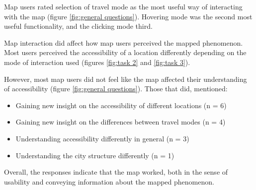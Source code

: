 Map users rated selection of travel mode as the most useful way of
interacting with the map (figure \ref{fig:general questions}).
Hovering mode was the second most useful functionality,
and the clicking mode third.

Map interaction did affect how map users perceived the mapped phenomenon.
Most users perceived the accessibility of a location differently depending
on the mode of interaction used (figures \ref{fig:task 2} and \ref{fig:task 3}).

However, most map users did not feel like the map affected
their understanding of accessibility (figure \ref{fig:general questions}).
Those that did, mentioned:

\begin{itemize}
	\item Gaining new insight on the accessibility of different locations (n = 6)
	\item Gaining new insight on the differences between travel modes (n = 4)
	\item Understanding accessibility differently in general (n = 3)
	\item Understanding the city structure differently (n = 1)
\end{itemize}

Overall, the responses indicate that the map worked,
both in the sense of usability and conveying information about the mapped phenomenon.

